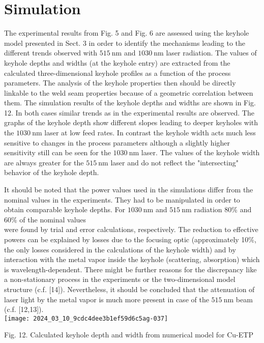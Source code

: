 \documentclass[10pt]{article}
\begin{document}
\section*{Simulation}
The experimental results from Fig. 5 and Fig. 6 are assessed using the keyhole model presented in Sect. 3 in order to identify the mechanisms leading to the different trends observed with $515 \mathrm{~nm}$ and $1030 \mathrm{~nm}$ laser radiation. The values of keyhole depths and widths (at the keyhole entry) are extracted from the calculated three-dimensional keyhole profiles as a function of the process parameters. The analysis of the keyhole properties then should be directly linkable to the weld seam properties because of a geometric correlation between them. The simulation results of the keyhole depths and widths are shown in Fig. 12. In both cases similar trends as in the experimental results are observed. The graphs of the keyhole depth show different slopes leading to deeper keyholes with the $1030 \mathrm{~nm}$ laser at low feed rates. In contrast the keyhole width acts much less sensitive to changes in the process parameters although a slightly higher sensitivity still can be seen for the $1030 \mathrm{~nm}$ laser. The values of the keyhole width are always greater for the $515 \mathrm{~nm}$ laser and do not reflect the "intersecting" behavior of the keyhole depth.

It should be noted that the power values used in the simulations differ from the nominal values in the experiments. They had to be manipulated in order to obtain comparable keyhole depths. For $1030 \mathrm{~nm}$ and $515 \mathrm{~nm}$ radiation $80 \%$ and $60 \%$ of the nominal values\\
were found by trial and error calculations, respectively. The reduction to effective powers can be explained by losses due to the focusing optic (approximately 10\%, the only losses considered in the calculations of the keyhole width) and by interaction with the metal vapor inside the keyhole (scattering, absorption) which is wavelength-dependent. There might be further reasons for the discrepancy like a non-stationary process in the experiments or the two-dimensional model structure (c.f. [14]). Nevertheless, it should be concluded that the attenuation of laser light by the metal vapor is much more present in case of the $515 \mathrm{~nm}$ beam (c.f. [12,13]).\\
\texttt{[image: 2024\_03\_10\_9cdc4dee3b1ef59d6c5ag-037]}

Fig. 12. Calculated keyhole depth and width from numerical model for Cu-ETP
\end{document}
